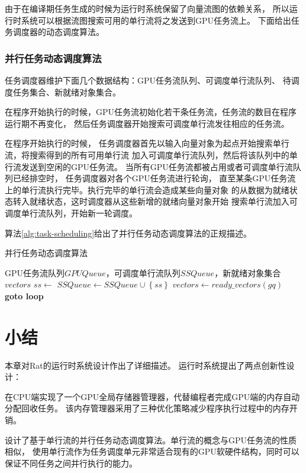 由于在编译期任务生成的时候为运行时系统保留了向量流图的依赖关系，
所以运行时系统可以根据流图搜索可用的单行流将之发送到GPU任务流上。
下面给出任务调度器的动态调度算法。

\subsubsection{并行任务动态调度算法}
任务调度器维护下面几个数据结构：GPU任务流队列、可调度单行流队列、
待调度任务集合、新就绪对象集合。

在程序开始执行的时候，GPU任务流初始化若干条任务流，任务流的数目在程序运行期不再变化，
然后任务调度器开始搜索可调度单行流发往相应的任务流。

在程序开始执行的时候，
任务调度器首先以输入向量对象为起点开始搜索单行流，将搜索得到的所有可用单行流
加入可调度单行流队列，然后将该队列中的单行流发送到空闲的GPU任务流。
当所有GPU任务流都被占用或者可调度单行流队列已经排空时，
任务调度器对各个GPU任务流进行轮询，
直至某条GPU任务流上的单行流执行完毕。执行完毕的单行流会造成某些向量对象
的从数据为就绪状态转入就绪状态，这时调度器从这些新增的就绪向量对象开始
搜索单行流加入可调度单行流队列，开始新一轮调度。

算法\ref{alg:task-scheduling}给出了并行任务动态调度算法的正规描述。
\begin{algorithm}
  \caption{并行任务动态调度算法}
  \label{alg:task-scheduling}
  \begin{algorithmic}[1]
    \Require GPU任务流队列$GPUQueue$，可调度单行流队列$SSQueue$，新就绪对象集合$vectors$
    \Loop
    \State $ss \leftarrow$ 
    \State $SSQueue \leftarrow SSQueue \cup \left\{ ss \right\}$
    \EndFor
    \State $vectors \leftarrow ready\_vectors(gq)$
    \State \textbf{goto loop} 
    \EndIf
    \EndFor
    \EndIf
    \EndLoop
    \EndFunction
  \end{algorithmic}
\end{algorithm}



\section{小结}
本章对Rat的运行时系统设计作出了详细描述。
运行时系统提出了两点创新性设计：

在CPU端实现了一个GPU全局存储器管理器，代替编程者完成GPU端的内存自动分配回收任务。
该内存管理器采用了三种优化策略减少程序执行过程中的内存开销。

设计了基于单行流的并行任务动态调度算法。单行流的概念与GPU任务流的性质相似，
使用单行流作为任务调度单元非常适合现有的GPU软硬件结构，同时可以
保证不同任务之间并行执行的能力。

